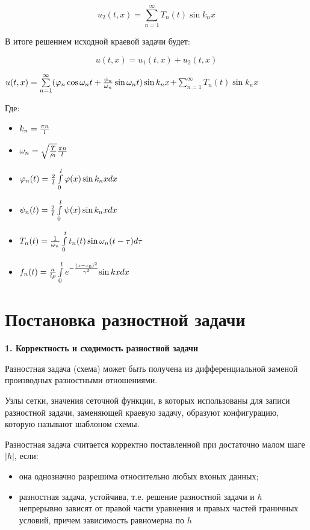 \documentclass[a4paper]{article}
\begin{document}
$$
u_2(t,x)=\sum\limits_{n=1}^\infty T_n(t)\sin k_nx
$$

В итоге решением исходной краевой задачи будет:

$$
u(t,x)=u_1(t,x)+u_2(t,x)
$$

\begin{center}
$
u(t,x) = \sum\limits_{n=1}^{\infty}(\varphi_n\cos\omega_{n}t+{\psi_n \over \omega_n }\sin\omega_{n}t)\sin k_{n}x$$+\sum\limits_{n=1}^\infty T_n(t)\sin k_nx
$
\end{center}

Где:
\begin{itemize}
    \item $k_n={\pi n \over l}$
    \item $\omega_n=\sqrt{T \over \rho_l}{\pi n \over l}$
    \item $\varphi_n(t)= {2 \over l} \int\limits_0^l\varphi(x)\sin k_{n}xdx$
    \item $\psi_n(t)= {2 \over l} \int\limits_0^l\psi(x)\sin k_{n}xdx$
    \item $T_n(t) = {1 \over \omega_n} \int\limits_0^t t_n(t) \sin \omega_n(t-\tau) d\tau$
    \item $ f_n(t)={a \over {l \rho }}  \int\limits_0^l{e^{-\frac{(x-x_0)^2}{\gamma^2}}{\sin kx} }dx$
\end{itemize}

\newpage

\section{Постановка разностной задачи} 
\textbf{1. Корректность и сходимость разностной задачи}

Разностная задача (схема) может быть получена из дифференциальной заменой производных разностными отношениями.

Узлы сетки, значения сеточной функции, в которых использованы для записи разностной задачи, заменяющей краевую задачу, образуют конфигурацию, которую называют шаблоном схемы.

Разностная задача считается корректно поставленной при достаточно малом шаге $|h|$, если:

\begin{itemize}
    \item она однозначно разрешима относительно любых вхоных данных;
    \item разностная задача, устойчива, т.е. решение разностной задачи и $h$ непрерывно зависят от правой части уравнения и правых частей граничных условий, причем зависимость равномерна по $h$
\end{itemize}
\end{document}
